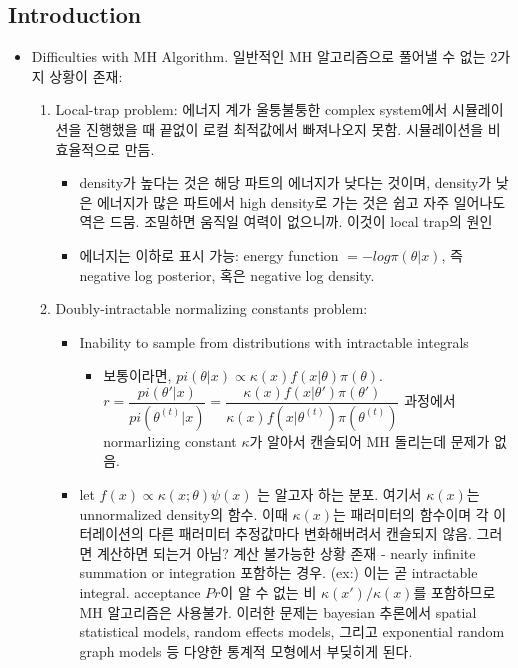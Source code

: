 \documentclass[
]{book}
\providecommand{\tightlist}{%
  \setlength{\itemsep}{0pt}\setlength{\parskip}{0pt}}
\begin{document}
\hypertarget{introduction}{%
\subsection{Introduction}\label{introduction}}

\begin{itemize}
\tightlist
\item
  Difficulties with MH Algorithm. 일반적인 MH 알고리즘으로 풀어낼 수 없는 2가지 상황이 존재:

  \begin{enumerate}
  \def\labelenumi{\arabic{enumi}.}
  \tightlist
  \item
    Local-trap problem: 에너지 계가 울퉁불퉁한 complex system에서 시뮬레이션을 진행했을 때 끝없이 로컬 최적값에서 빠져나오지 못함. 시뮬레이션을 비효율적으로 만듬.

    \begin{itemize}
    \tightlist
    \item
      density가 높다는 것은 해당 파트의 에너지가 낮다는 것이며, density가 낮은 에너지가 많은 파트에서 high density로 가는 것은 쉽고 자주 일어나도 역은 드뭄. 조밀하면 움직일 여력이 없으니까. 이것이 local trap의 원인
    \item
      에너지는 이하로 표시 가능: energy function \(= -log \pi(\theta \vert x)\), 즉 negative log posterior, 혹은 negative log density.
    \end{itemize}
  \item
    Doubly-intractable normalizing constants problem:

    \begin{itemize}
    \tightlist
    \item
      Inability to sample from distributions with intractable integrals

      \begin{itemize}
      \tightlist
      \item
        보통이라면, \(pi(\theta \vert x) \propto \kappa(x) f(x\vert\theta)\pi(\theta)\). \(r= \dfrac{pi(\theta ' \vert x)}{pi(\theta^{(t)} \vert x)} = \dfrac{\kappa(x) f(x\vert\theta ' )\pi(\theta ' )}{\kappa(x) f(x\vert\theta^{(t)})\pi(\theta^{(t)})}\) 과정에서 normarlizing constant \(\kappa\)가 알아서 캔슬되어 MH 돌리는데 문제가 없음.
      \end{itemize}
    \item
      let \(f(x) \propto \kappa(x;\theta) \psi(x)\) 는 알고자 하는 분포. 여기서 \(\kappa(x)\)는 unnormalized density의 함수. 이때 \(\kappa(x)\)는 패러미터의 함수이며 각 이터레이션의 다른 패러미터 추정값마다 변화해버려서 캔슬되지 않음. 그러면 계산하면 되는거 아님? 계산 불가능한 상황 존재 - nearly infinite summation or integration 포함하는 경우. (ex:) 이는 곧 intractable integral. acceptance \(Pr\)이 알 수 없는 비 \(\kappa(x')/\kappa(x)\)를 포함하므로 MH 알고리즘은 사용불가. 이러한 문제는 bayesian 추론에서 spatial statistical models, random effects models, 그리고 exponential random graph models 등 다양한 통계적 모형에서 부딪히게 된다.


\end{itemize}
\end{enumerate}
\end{itemize}
\end{document}
